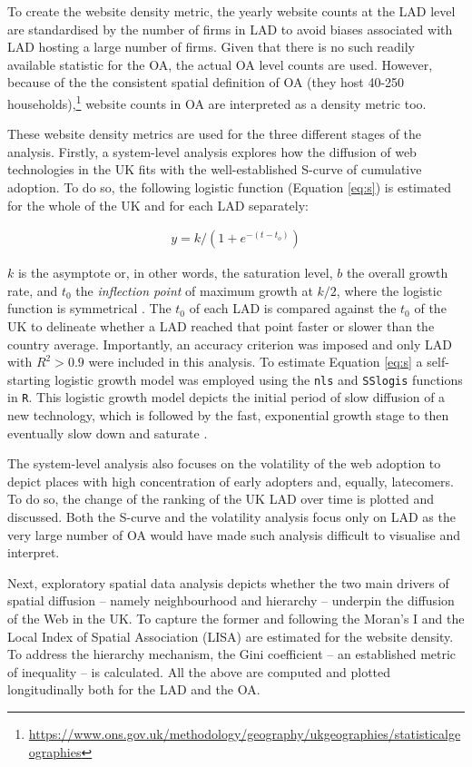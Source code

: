 \documentclass[
  authoryear,
  preprint,
  3p]{elsarticle}
\begin{document}
To create the website density metric, the yearly website counts at the
LAD level are standardised by the number of firms in LAD to avoid biases
associated with LAD hosting a large number of firms. Given that there is
no such readily available statistic for the OA, the actual OA level
counts are used. However, because of the the consistent spatial
definition of OA (they host 40-250 households),\footnote{\url{https://www.ons.gov.uk/methodology/geography/ukgeographies/statisticalgeographies}}
website counts in OA are interpreted as a density metric too.

These website density metrics are used for the three different stages of
the analysis. Firstly, a system-level analysis explores how the
diffusion of web technologies in the UK fits with the well-established
S-curve of cumulative adoption. To do so, the following logistic
function (Equation \ref{eq:s}) is estimated for the whole of the UK and
for each LAD separately:

\begin{align}
y = k /(1 + e^{-(t-t_{o})})\label{eq:s}
\end{align}

\noindent \(k\) is the asymptote or, in other words, the saturation
level, \(b\) the overall growth rate, and \(t_{0}\) the \emph{inflection
point} of maximum growth at \(k/2\), where the logistic function is
symmetrical \citep{wilson201281}. The \(t_0\) of each LAD is compared
against the \(t_0\) of the UK to delineate whether a LAD reached that
point faster or slower than the country average. Importantly, an
accuracy criterion was imposed and only LAD with \(R^2 > 0.9\) were
included in this analysis. To estimate Equation \ref{eq:s} a
self-starting logistic growth model was employed using the \texttt{nls}
and \texttt{SSlogis} functions in \texttt{R}. This logistic growth model
depicts the initial period of slow diffusion of a new technology, which
is followed by the fast, exponential growth stage to then eventually
slow down and saturate \citep{wilson201281, grubler1999dynamics}.

The system-level analysis also focuses on the volatility of the web
adoption to depict places with high concentration of early adopters and,
equally, latecomers. To do so, the change of the ranking of the UK LAD
over time is plotted and discussed. Both the S-curve and the volatility
analysis focus only on LAD as the very large number of OA would have
made such analysis difficult to visualise and interpret.

Next, exploratory spatial data analysis depicts whether the two main
drivers of spatial diffusion -- namely neighbourhood and hierarchy --
underpin the diffusion of the Web in the UK. To capture the former and
following \citet{ding2010modeling} the Moran's I and the Local Index of
Spatial Association (LISA) are estimated for the website density. To
address the hierarchy mechanism, the Gini coefficient -- an established
metric of inequality -- is calculated. All the above are computed and
plotted longitudinally both for the LAD and the OA.
\end{document}
